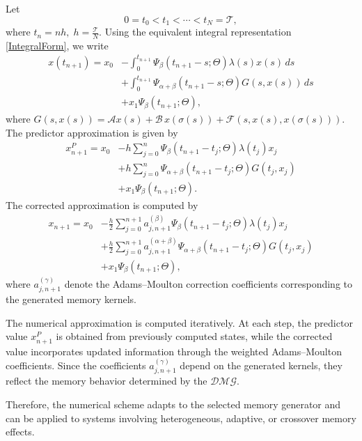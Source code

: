 \documentclass[11pt]{article}
\numberwithin{equation}{section}
\begin{document}
Let
\[
0=t_{0}<t_{1}<\cdots<t_{N}=\mathcal{T},
\]
where
\(
t_{n}=nh,
\;
h=\frac{\mathcal{T}}{N}.
\)
Using the equivalent integral representation \eqref{IntegralForm}, we write
\begin{align}
x(t_{n+1})
=
x_{0}
&-
\int_{0}^{t_{n+1}}
\Psi_{\beta}(t_{n+1}-s;\Theta)
\lambda(s)x(s)\,ds
\nonumber\\
&+
\int_{0}^{t_{n+1}}
\Psi_{\alpha+\beta}(t_{n+1}-s;\Theta)
G(s,x(s))\,ds
\nonumber\\
&+
x_{1}\Psi_{\beta}(t_{n+1};\Theta),
\label{NumericalIntegral}
\end{align}
where
\(
G(s,x(s))
=
\mathcal{A}x(s)
+
\mathcal{B}\,x(\sigma(s))
+
\mathcal{F}(s,x(s),x(\sigma(s))).
\)
The predictor approximation is given by
\begin{align}
x_{n+1}^{P}
=
x_{0}
&-
h
\sum_{j=0}^{n}
\Psi_{\beta}(t_{n+1}-t_{j};\Theta)
\lambda(t_{j})x_{j}
\nonumber\\
&+
h
\sum_{j=0}^{n}
\Psi_{\alpha+\beta}(t_{n+1}-t_{j};\Theta)
G(t_{j},x_{j})
\nonumber\\
&+
x_{1}\Psi_{\beta}(t_{n+1};\Theta).
\end{align}
The corrected approximation is computed by
\begin{align}
x_{n+1}
=
x_{0}
&-
\frac{h}{2}
\sum_{j=0}^{n+1}
a_{j,n+1}^{(\beta)}
\Psi_{\beta}(t_{n+1}-t_{j};\Theta)
\lambda(t_{j})x_{j}
\nonumber\\
&+
\frac{h}{2}
\sum_{j=0}^{n+1}
a_{j,n+1}^{(\alpha+\beta)}
\Psi_{\alpha+\beta}(t_{n+1}-t_{j};\Theta)
G(t_{j},x_{j})
\nonumber\\
&+
x_{1}\Psi_{\beta}(t_{n+1};\Theta),
\end{align}
where
\(
a_{j,n+1}^{(\gamma)}
\)
denote the Adams--Moulton correction coefficients corresponding to the generated memory kernels.

The numerical approximation is computed iteratively. At each step, the predictor value
\(
x_{n+1}^{P}
\)
is obtained from previously computed states, while the corrected value incorporates updated information through the weighted Adams--Moulton coefficients. Since the coefficients
\(
a_{j,n+1}^{(\gamma)}
\)
depend on the generated kernels, they reflect the memory behavior determined by the $\mathcal{DMG}$.

Therefore, the numerical scheme adapts to the selected memory generator and can be applied to systems involving heterogeneous, adaptive, or crossover memory effects.

\end{document}
